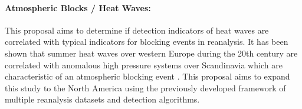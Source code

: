 \documentclass[11pt]{article}
\newcommand\citep{\cite}
\begin{document}





\paragraph{Atmospheric Blocks / Heat Waves:}  This proposal aims to determine if detection indicators of heat waves are correlated with typical indicators for blocking events in reanalysis.  It has been shown that summer heat waves over western Europe {\color{blue}during} the 20th century are correlated with anomalous high pressure systems over Scandinavia {\color{blue}which are}  characteristic of an atmospheric blocking event \cite{della2007summer}.  This proposal aims to expand this study to the North America using the previously developed framework of multiple reanalysis datasets and detection algorithms.

\end{document}
